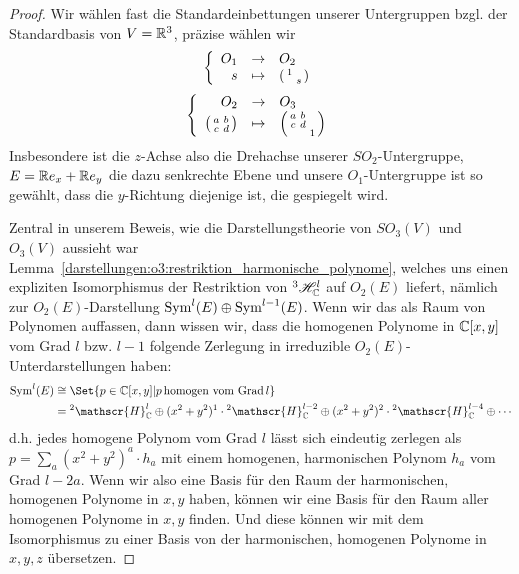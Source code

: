 \begin{proof}
Wir wählen fast die Standardeinbettungen unserer Untergruppen bzgl. der Standardbasis von $V=\mathbb{R}^3$, präzise wählen wir
\[\left\lbrace\begin{array}{rcl}
O_1 &\to& O_2 \\
s &\mapsto& \begin{psmallmatrix}1 &\\ & s \end{psmallmatrix}
\end{array}\right.\]
\[\left\lbrace\begin{array}{rcl}
O_2 &\to& O_3 \\
\begin{psmallmatrix}a&b\\c&d\end{psmallmatrix} &\mapsto& \begin{psmallmatrix}a&b&\\c&d&\\& & 1 \end{psmallmatrix}
\end{array}\right.\]
Insbesondere ist die $z$-Achse also die Drehachse unserer $SO_2$-Untergruppe, $E=\mathbb{R} e_x + \mathbb{R} e_y$ die dazu senkrechte Ebene und unsere $O_1$-Untergruppe ist so gewählt, dass die $y$-Richtung diejenige ist, die gespiegelt wird.

\medbreak
Zentral in unserem Beweis, wie die Darstellungstheorie von $SO_3(V)$ und $O_3(V)$ aussieht war Lemma~\ref{darstellungen:o3:restriktion_harmonische_polynome}, welches uns einen expliziten Isomorphismus der Restriktion von ${^3} \mathscr{H}_{\mathbb{C}}^l$ auf $O_2(E)$ liefert, nämlich zur $O_2(E)$-Darstellung $\operatorname{Sym}^l(E)\oplus\operatorname{Sym}^{l-1}(E)$. Wenn wir das als Raum von Polynomen auffassen, dann wissen wir, dass die homogenen Polynome in $\mathbb{C}[x,y]$ vom Grad $l$ bzw. $l-1$ folgende Zerlegung in irreduzible $O_2(E)$-Unterdarstellungen haben:
\begin{align*}
\Sym^l(E) &\isomorphic \Set{p \in\IC[x,y] | p\,\text{homogen vom Grad}\,l} \\
&= {^2\mathscr{H}_\IC^l} \oplus (x^2+y^2)^1\cdot {^2 \mathscr{H}_\IC^{l-2}} \oplus (x^2+y^2)^2\cdot {^2 \mathscr{H}_\IC^{l-4}}\oplus\cdots
\end{align*}
d.h. jedes homogene Polynom vom Grad $l$ lässt sich eindeutig zerlegen als $p=\sum_a (x^2+y^2)^a \cdot h_a$ mit einem homogenen, harmonischen Polynom $h_a$ vom Grad $l-2a$. Wenn wir also eine Basis für den Raum der harmonischen, homogenen Polynome in $x,y$ haben, können wir eine Basis für den Raum aller homogenen Polynome in $x,y$ finden. Und diese können wir mit dem Isomorphismus zu einer Basis von der harmonischen, homogenen Polynome in $x,y,z$ übersetzen.


\end{proof}
